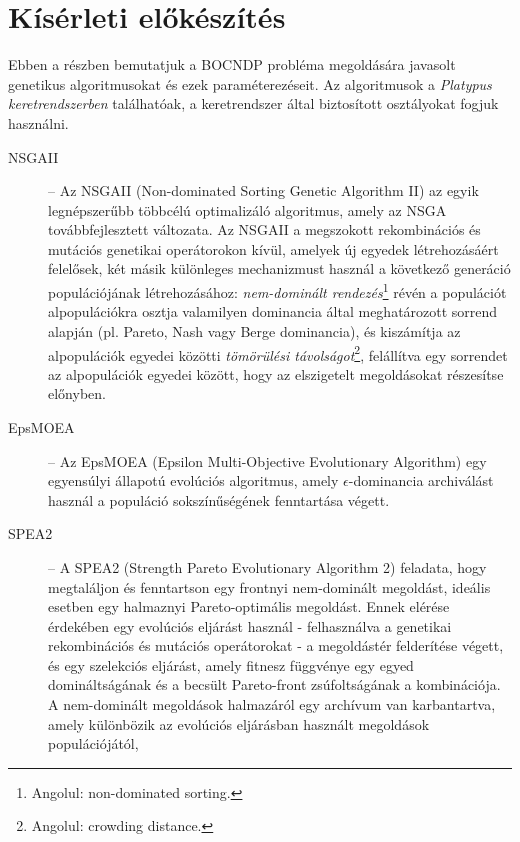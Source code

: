 \section{Kísérleti előkészítés}\label{sec:KISERLETI_ELOKESZITES}

Ebben a részben bemutatjuk a BOCNDP probléma megoldására javasolt genetikus algoritmusokat és ezek paraméterezéseit.
Az algoritmusok a \emph{Platypus keretrendszerben} \cite{hadka2017platypus} találhatóak, a keretrendszer által biztosított osztályokat fogjuk használni.

\begin{description}
      \item[NSGAII] -- Az NSGAII (Non-dominated Sorting Genetic Algorithm II) \cite{deb2002fast} az egyik legnépszerűbb többcélú optimalizáló algoritmus,
            amely az NSGA továbbfejlesztett változata. Az NSGAII a megszokott rekombinációs és mutációs genetikai operátorokon kívül,
            amelyek új egyedek létrehozásáért felelősek, két másik különleges mechanizmust használ a következő generáció populációjának létrehozásához:
            \textit{nem-dominált rendezés}\footnote{ Angolul: non-dominated sorting. } révén a populációt alpopulációkra
            osztja valamilyen dominancia által meghatározott sorrend alapján (pl. Pareto, Nash vagy Berge dominancia),
            és kiszámítja az alpopulációk egyedei közötti \textit{tömörülési távolságot}\footnote{ Angolul: crowding distance. },
            felállítva egy sorrendet az alpopulációk egyedei között, hogy az elszigetelt megoldásokat részesítse előnyben.
      \item[EpsMOEA] -- Az EpsMOEA (Epsilon Multi-Objective Evolutionary Algorithm) \cite{deb2003towards} egy egyensúlyi állapotú evolúciós algoritmus,
            amely $\epsilon$-dominancia archiválást használ a populáció sokszínűségének fenntartása végett.
      \item[SPEA2] -- A SPEA2 (Strength Pareto Evolutionary Algorithm 2) \cite{zitzler2001spea2} feladata, hogy megtaláljon és fenntartson egy frontnyi nem-dominált megoldást,
            ideális esetben egy halmaznyi Pareto-optimális megoldást. Ennek elérése érdekében egy evolúciós eljárást használ
            - felhasználva a genetikai rekombinációs és mutációs operátorokat - a megoldástér felderítése végett,
            és egy szelekciós eljárást, amely fitnesz függvénye egy egyed domináltságának és a becsült Pareto-front zsúfoltságának a kombinációja.
            A nem-dominált megoldások halmazáról egy archívum van karbantartva, amely különbözik az evolúciós eljárásban használt megoldások populációjától,

\end{description}
